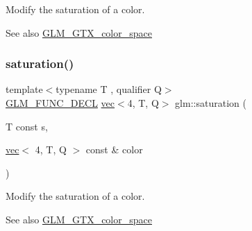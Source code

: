 Modify the saturation of a color. \begin{DoxySeeAlso}{See also}
\mbox{\hyperlink{group__gtx__color__space}{G\+L\+M\+\_\+\+G\+T\+X\+\_\+color\+\_\+space}} 
\end{DoxySeeAlso}
\mbox{\label{group__gtx__color__space_gaba0eacee0736dae860e9371cc1ae4785}} 
\subsubsection{\texorpdfstring{saturation()}{saturation()}\hspace{0.1cm}{\footnotesize\ttfamily [3/3]}}
{\footnotesize\ttfamily template$<$typename T , qualifier Q$>$ \\
\mbox{\hyperlink{setup_8hpp_ab2d052de21a70539923e9bcbf6e83a51}{G\+L\+M\+\_\+\+F\+U\+N\+C\+\_\+\+D\+E\+CL}} \mbox{\hyperlink{structglm_1_1vec}{vec}}$<$4, T, Q$>$ glm\+::saturation (\begin{DoxyParamCaption}\item[{T const}]{s,  }\item[{\mbox{\hyperlink{structglm_1_1vec}{vec}}$<$ 4, T, Q $>$ const \&}]{color }\end{DoxyParamCaption})}

Modify the saturation of a color. \begin{DoxySeeAlso}{See also}
\mbox{\hyperlink{group__gtx__color__space}{G\+L\+M\+\_\+\+G\+T\+X\+\_\+color\+\_\+space}} 
\end{DoxySeeAlso}
